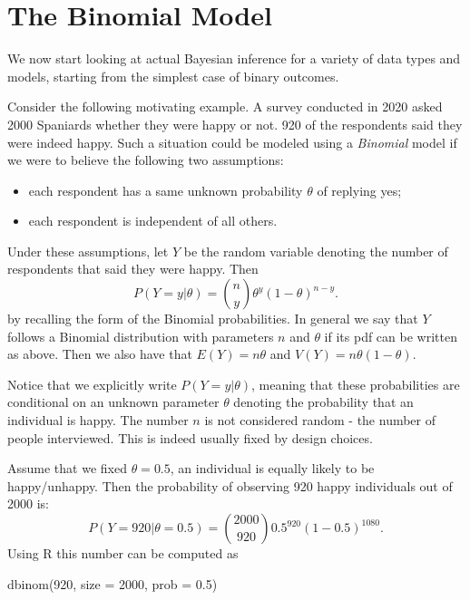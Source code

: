 \documentclass[
]{book}
\newenvironment{Shaded}{\begin{snugshade}}{\end{snugshade}}
\newcommand{\AttributeTok}[1]{\textcolor[rgb]{0.77,0.63,0.00}{#1}}
\newcommand{\DecValTok}[1]{\textcolor[rgb]{0.00,0.00,0.81}{#1}}
\newcommand{\FloatTok}[1]{\textcolor[rgb]{0.00,0.00,0.81}{#1}}
\newcommand{\FunctionTok}[1]{\textcolor[rgb]{0.00,0.00,0.00}{#1}}
\newcommand{\NormalTok}[1]{#1}
\begin{document}
\hypertarget{bin}{%
\chapter{The Binomial Model}\label{bin}}

We now start looking at actual Bayesian inference for a variety of data types and models, starting from the simplest case of binary outcomes.

Consider the following motivating example. A survey conducted in 2020 asked 2000 Spaniards whether they were happy or not. 920 of the respondents said they were indeed happy. Such a situation could be modeled using a \emph{Binomial} model if we were to believe the following two assumptions:

\begin{itemize}
\item
  each respondent has a same unknown probability \(\theta\) of replying yes;
\item
  each respondent is independent of all others.
\end{itemize}

Under these assumptions, let \(Y\) be the random variable denoting the number of respondents that said they were happy. Then
\[
P(Y=y|\theta) = \binom{n}{y}\theta^{y}(1-\theta)^{n-y}.
\]
by recalling the form of the Binomial probabilities. In general we say that \(Y\) follows a Binomial distribution with parameters \(n\) and \(\theta\) if its pdf can be written as above. Then we also have that \(E(Y)=n\theta\) and \(V(Y)=n\theta(1-\theta)\).

Notice that we explicitly write \(P(Y=y|\theta)\), meaning that these probabilities are conditional on an unknown parameter \(\theta\) denoting the probability that an individual is happy. The number \(n\) is not considered random - the number of people interviewed. This is indeed usually fixed by design choices.

Assume that we fixed \(\theta = 0.5\), an individual is equally likely to be happy/unhappy. Then the probability of observing 920 happy individuals out of 2000 is:
\[
P(Y=920|\theta=0.5)=\binom{2000}{920}0.5^{920}(1-0.5)^{1080}.
\]
Using R this number can be computed as

\begin{Shaded}
\begin{Highlighting}[]
\FunctionTok{dbinom}\NormalTok{(}\DecValTok{920}\NormalTok{, }\AttributeTok{size =} \DecValTok{2000}\NormalTok{, }\AttributeTok{prob =} \FloatTok{0.5}\NormalTok{)}
\end{Highlighting}
\end{Shaded}
\end{document}
